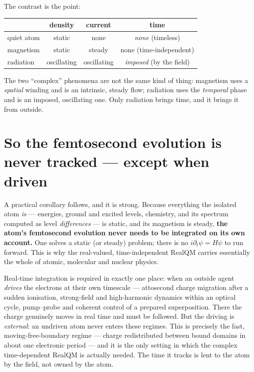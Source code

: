 \documentclass[11pt]{article}
\begin{document}
\medskip
\noindent The contrast is the point:

\begin{center}
\begin{tabular}{lccc}
 & density & current & time \\ \hline
quiet atom & static & none & \emph{none} (timeless) \\
magnetism & static & steady & none (time-independent) \\
radiation & oscillating & oscillating & \emph{imposed} (by the field) \\
\end{tabular}
\end{center}

The two ``complex'' phenomena are not the same kind of thing: magnetism uses a \emph{spatial} winding and is
an intrinsic, steady flow; radiation uses the \emph{temporal} phase and is an imposed, oscillating one. Only
radiation brings time, and it brings it from outside.

\section{So the femtosecond evolution is never tracked --- except when driven}

A practical corollary follows, and it is strong. Because everything the isolated atom \emph{is} --- energies,
ground and excited levels, chemistry, and its spectrum computed as level \emph{differences} --- is static, and
its magnetism is steady, \textbf{the atom's femtosecond evolution never needs to be integrated on its own
account.} One solves a static (or steady) problem; there is no $i\partial_t\psi=H\psi$ to run forward. This is
why the real-valued, time-independent RealQM carries essentially the whole of atomic, molecular and nuclear
physics.

Real-time integration is required in exactly one place: when an outside agent \emph{drives} the electrons at
their own timescale --- attosecond charge migration after a sudden ionisation, strong-field and high-harmonic
dynamics within an optical cycle, pump--probe and coherent control of a prepared superposition. There the
charge genuinely moves in real time and must be followed. But the driving is \emph{external}: an undriven atom
never enters these regimes. This is precisely the fast, moving-free-boundary regime --- charge redistributed
between bound domains in about one electronic period --- and it is the only setting in which the complex
time-dependent RealQM is actually needed. The time it tracks is lent to the atom by the field, not owned by
the atom.
\end{document}
